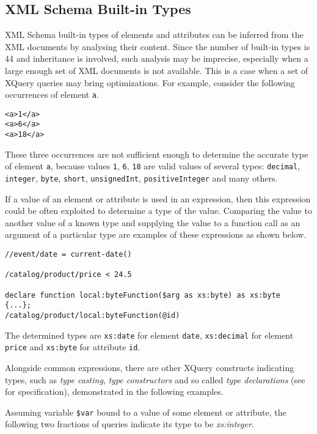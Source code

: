 \subsection{XML Schema Built-in Types}
XML Schema built-in types of elements and attributes can be inferred from the XML documents by analysing their content. Since the number of built-in types is 44 and inheritance is involved, such analysis may be imprecise, especially when a large enough set of XML documents is not available. This is a case when a set of XQuery queries may bring optimizations. For example, consider the following occurrences of element \texttt{a}.

\begin{verbatim}
<a>1</a>
<a>6</a>
<a>18</a>
\end{verbatim}

These three occurrences are not sufficient enough to determine the accurate type of element \texttt{a}, because values \texttt{1}, \texttt{6}, \texttt{18} are valid values of several types: \texttt{decimal}, \texttt{integer}, \texttt{byte}, \texttt{short}, \texttt{unsignedInt}, \texttt{positiveInteger} and many others.

If a value of an element or attribute is used in an expression, then this expression could be often exploited to determine a type of the value. Comparing the value to another value of a known type and supplying the value to a function call as an argument of a particular type are examples of these expressions as shown below.

\begin{verbatim}
//event/date = current-date()

/catalog/product/price < 24.5

declare function local:byteFunction($arg as xs:byte) as xs:byte
{...};
/catalog/product/local:byteFunction(@id)
\end{verbatim}

The determined types are \texttt{xs:date} for element \texttt{date}, \texttt{xs:decimal} for element \texttt{price} and \texttt{xs:byte} for attribute \texttt{id}.

Alongside common expressions, there are other XQuery constructs indicating types, such as \emph{type casting}, \emph{type constructors} and so called \emph{type declarations} (see \cite{w3c_xquery} for specification), demonstrated in the following examples.

Assuming variable \texttt{\$var} bound to a value of some element or attribute, the following two fractions of queries indicate its type to be \emph{xs:integer}.

